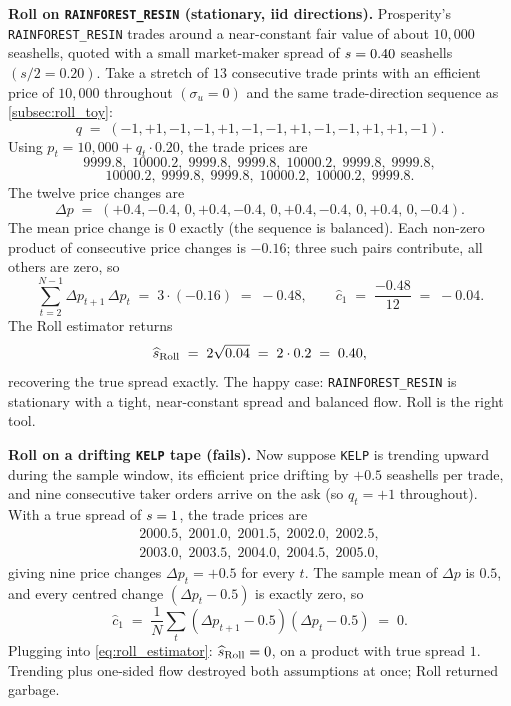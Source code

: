 \begin{prosperitybox}
\textbf{Roll on \texttt{RAINFOREST\_RESIN} (stationary, iid
directions).} Prosperity's \texttt{RAINFOREST\_RESIN} trades
around a near-constant fair value of about $10{,}000$ seashells,
quoted with a small market-maker spread of $s = 0.40$
seashells $(s/2 = 0.20)$. Take a stretch of $13$ consecutive
trade prints with an efficient price of $10{,}000$ throughout
$(\sigma_u = 0)$ and the same trade-direction sequence as
\cref{subsec:roll_toy}:
\[
  q \;=\; (-1,+1,-1,-1,+1,-1,-1,+1,-1,-1,+1,+1,-1).
\]
Using $p_t = 10{,}000 + q_t \cdot 0.20$, the trade prices are
\[
  9999.8,\;10000.2,\;9999.8,\;9999.8,\;10000.2,\;9999.8,\;9999.8,
\]
\[
  10000.2,\;9999.8,\;9999.8,\;10000.2,\;10000.2,\;9999.8.
\]
The twelve price changes are
\[
  \Delta p \;=\; (+0.4,-0.4,\,0,+0.4,-0.4,\,0,+0.4,-0.4,\,0,+0.4,\,0,-0.4).
\]
The mean price change is $0$ exactly (the sequence is balanced).
Each non-zero product of consecutive price changes is $-0.16$;
three such pairs contribute, all others are zero, so
\[
  \sum_{t=2}^{N-1} \Delta p_{t+1}\,\Delta p_t
  \;=\; 3 \cdot (-0.16) \;=\; -0.48,
  \qquad
  \hat c_1 \;=\; \frac{-0.48}{12} \;=\; -0.04.
\]
The Roll estimator returns
\[
  \widehat{s}_{\mathrm{Roll}}
  \;=\; 2\sqrt{0.04} \;=\; 2 \cdot 0.2 \;=\; 0.40,
\]
recovering the true spread exactly. The happy case:
\texttt{RAINFOREST\_RESIN} is stationary with a tight, near-constant
spread and balanced flow. Roll is the right tool.

\medskip
\textbf{Roll on a drifting \texttt{KELP} tape (fails).} Now suppose
\texttt{KELP} is trending upward during the sample window, its
efficient price drifting by $+0.5$ seashells per trade, and
nine consecutive taker orders arrive on the ask (so
$q_t = +1$ throughout). With a true spread of $s = 1$, the
trade prices are
\begin{gather*}
  2000.5,\;2001.0,\;2001.5,\;2002.0,\;2002.5, \\
  2003.0,\;2003.5,\;2004.0,\;2004.5,\;2005.0,
\end{gather*}
giving nine price changes $\Delta p_t = +0.5$ for every $t$. The
sample mean of $\Delta p$ is $0.5$, and every centred change
$(\Delta p_t - 0.5)$ is exactly zero, so
\[
  \hat c_1 \;=\; \frac{1}{N}\sum_t (\Delta p_{t+1} - 0.5)(\Delta p_t - 0.5)
  \;=\; 0.
\]
Plugging into \cref{eq:roll_estimator}: $\widehat{s}_{\mathrm{Roll}}
= 0$, on a product with true spread $1$. Trending plus one-sided
flow destroyed both assumptions at once; Roll returned garbage.


\end{prosperitybox}
